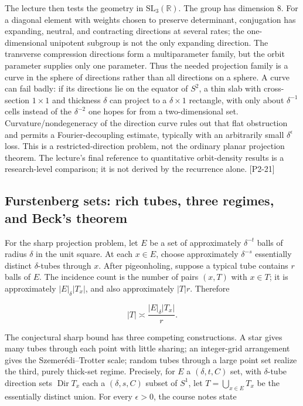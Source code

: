 The lecture then tests the geometry in \(\mathrm{SL}_3(\mathbb R)\). The group has dimension \(8\). For a diagonal element with weights chosen to preserve determinant, conjugation has expanding, neutral, and contracting directions at several rates; the one-dimensional unipotent subgroup is not the only expanding direction. The transverse compression directions form a multiparameter family, but the orbit parameter supplies only one parameter. Thus the needed projection family is a curve in the sphere of directions rather than all directions on a sphere. A curve can fail badly: if its directions lie on the equator of \(S^2\), a thin slab with cross-section \(1\times1\) and thickness \(\delta\) can project to a \(\delta\times1\) rectangle, with only about \(\delta^{-1}\) cells instead of the \(\delta^{-2}\) one hopes for from a two-dimensional set. Curvature/nondegeneracy of the direction curve rules out that flat obstruction and permits a Fourier-decoupling estimate, typically with an arbitrarily small \(\delta^\epsilon\) loss. This is a restricted-direction problem, not the ordinary planar projection theorem. The lecture's final reference to quantitative orbit-density results is a research-level comparison; it is not derived by the recurrence alone. {[}P2-21{]}

\subsection{Furstenberg sets: rich tubes, three regimes, and Beck's theorem}\label{04-visual-computing-ii-ch033-furstenberg-sets-rich-tubes-three-regimes-and-becks-theorem-1}

For the sharp projection problem, let \(E\) be a set of approximately \(\delta^{-t}\) balls of radius \(\delta\) in the unit square. At each \(x\in E\), choose approximately \(\delta^{-s}\) essentially distinct \(\delta\)-tubes through \(x\). After pigeonholing, suppose a typical tube contains \(r\) balls of \(E\). The incidence count is the number of pairs \((x,T)\) with \(x\in T\); it is approximately \(|E|_\delta |T_x|\), and also approximately \(|T|r\). Therefore

\[|T|\asymp \frac{|E|_\delta |T_x|}{r}.\]

The conjectural sharp bound has three competing constructions. A star gives many tubes through each point with little sharing; an integer-grid arrangement gives the Szemerédi--Trotter scale; random tubes through a large point set realize the third, purely thick-set regime. Precisely, for \(E\) a \((\delta,t,C)\) set, with \(\delta\)-tube direction sets \(\operatorname{Dir}T_x\) each a \((\delta,s,C)\) subset of \(S^1\), let \(T=\bigcup_{x\in E}T_x\) be the essentially distinct union. For every \(\epsilon>0\), the course notes state

